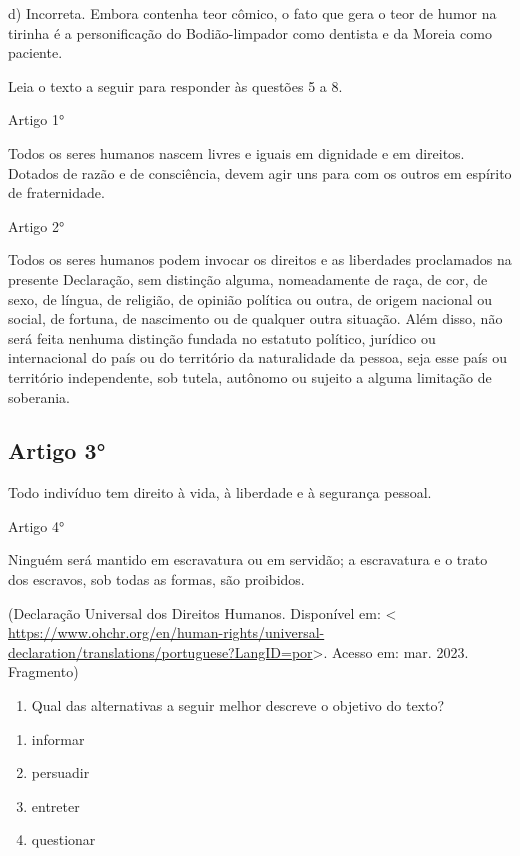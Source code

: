d) Incorreta. Embora contenha teor cômico, o fato que gera o teor de
humor na tirinha é a personificação do Bodião-limpador como dentista e
da Moreia como paciente.

Leia o texto a seguir para responder às questões 5 a 8.

Artigo 1°

Todos os seres humanos nascem livres e iguais em dignidade e em
direitos. Dotados de razão e de consciência, devem agir uns para com os
outros em espírito de fraternidade.

Artigo 2°

Todos os seres humanos podem invocar os direitos e as liberdades
proclamados na presente Declaração, sem distinção alguma, nomeadamente
de raça, de cor, de sexo, de língua, de religião, de opinião política ou
outra, de origem nacional ou social, de fortuna, de nascimento ou de
qualquer outra situação. Além disso, não será feita nenhuma distinção
fundada no estatuto político, jurídico ou internacional do país ou do
território da naturalidade da pessoa, seja esse país ou território
independente, sob tutela, autônomo ou sujeito a alguma limitação de
soberania.

\hypertarget{artigo-3}{%
\subsection{Artigo 3°}\label{artigo-3}}

Todo indivíduo tem direito à vida, à liberdade e à segurança pessoal.

Artigo 4°

Ninguém será mantido em escravatura ou em servidão; a escravatura e o
trato dos escravos, sob todas as formas, são proibidos.

(Declaração Universal dos Direitos Humanos. Disponível em: \textless{}
\url{https://www.ohchr.org/en/human-rights/universal-declaration/translations/portuguese?LangID=por}\textgreater.
Acesso em: mar. 2023. Fragmento)

\begin{enumerate}
\def\labelenumi{\arabic{enumi}.}
\setcounter{enumi}{4}
\tightlist
\item
  Qual das alternativas a seguir melhor descreve o objetivo do texto?
\end{enumerate}

\begin{enumerate}
\def\labelenumi{\alph{enumi})}
\item
  informar
\item
  persuadir
\item
  entreter
\item
  questionar
\end{enumerate}

